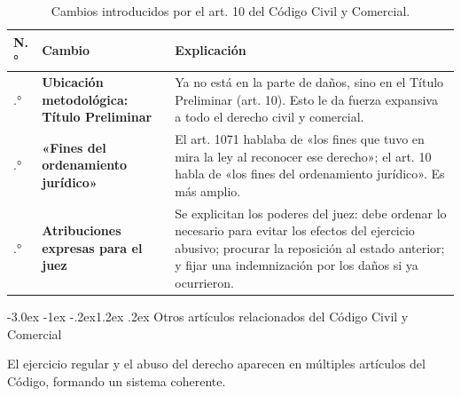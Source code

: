 \documentclass[12pt,oneside]{book}
\makeatletter
\renewcommand\section{\@startsection{section}{1}{\z@}%
  {-3.0ex \@plus -1ex \@minus -.2ex}{1.2ex \@plus .2ex}%
  {\normalfont\large\bfseries\color{acento}}}
\makeatother
\begin{document}
\begin{table}[H]
\centering
\begin{tabularx}{\textwidth}{
    >{\centering\arraybackslash}p{1cm}
    >{\raggedright\arraybackslash}p{4.2cm}
    >{\raggedright\arraybackslash}X
}
\toprule
\textbf{N.°} & \textbf{Cambio} & \textbf{Explicación} \\
\midrule
1.° & \textbf{Ubicación metodológica: Título Preliminar} & Ya no está en la parte de daños, sino en el Título Preliminar (art. 10). Esto le da fuerza expansiva a todo el derecho civil y comercial. \\
\addlinespace
2.° & \textbf{«Fines del ordenamiento jurídico»} & El art. 1071 hablaba de «los fines que tuvo en mira la ley al reconocer ese derecho»; el art. 10 habla de «los fines del ordenamiento jurídico». Es más amplio. \\
\addlinespace
3.° & \textbf{Atribuciones expresas para el juez} & Se explicitan los poderes del juez: debe ordenar lo necesario para evitar los efectos del ejercicio abusivo; procurar la reposición al estado anterior; y fijar una indemnización por los daños si ya ocurrieron. \\
\bottomrule
\end{tabularx}
\caption{Cambios introducidos por el art. 10 del Código Civil y Comercial.}
\end{table}

\section{Otros artículos relacionados del Código Civil y Comercial}

El ejercicio regular y el abuso del derecho aparecen en múltiples artículos del Código, formando un sistema coherente.
\end{document}
